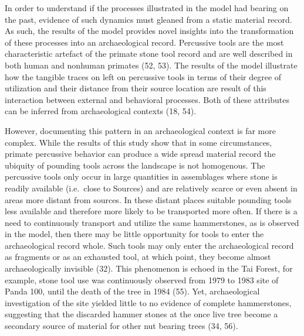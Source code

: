\documentclass[9pt,twocolumn,twoside,]{pnas-new}
\begin{document}
In order to understand if the processes illustrated in the model had
bearing on the past, evidence of such dynamics must gleaned from a
static material record. As such, the results of the model provides novel
insights into the transformation of these processes into an
archaeological record. Percussive tools are the most characteristic
artefact of the primate stone tool record and are well described in both
human and nonhuman primates (52, 53). The results of the model
illustrate how the tangible traces on left on percussive tools in terms
of their degree of utilization and their distance from their source
location are result of this interaction between external and behavioral
processes. Both of these attributes can be inferred from archaeological
contexts (18, 54).

However, documenting this pattern in an archaeological context is far
more complex. While the results of this study show that in some
circumstances, primate percussive behavior can produce a wide spread
material record the ubiquity of pounding tools across the landscape is
not homogenous. The percussive tools only occur in large quantities in
assemblages where stone is readily available (i.e.~close to Sources) and
are relatively scarce or even absent in areas more distant from sources.
In these distant places suitable pounding tools less available and
therefore more likely to be transported more often. If there is a need
to continuously transport and utilize the same hammerstones, as is
observed in the model, then there may be little opportunity for tools to
enter the archaeological record whole. Such tools may only enter the
archaeological record as fragments or as an exhausted tool, at which
point, they become almost archaeologically invisible (32). This
phenomenon is echoed in the Tai Forest, for example, stone tool use was
continuously observed from 1979 to 1983 site of Panda 100, until the
death of the tree in 1984 (55). Yet, archaeological investigation of the
site yielded little to no evidence of complete hammerstones, suggesting
that the discarded hammer stones at the once live tree become a
secondary source of material for other nut bearing trees (34, 56).
\end{document}
